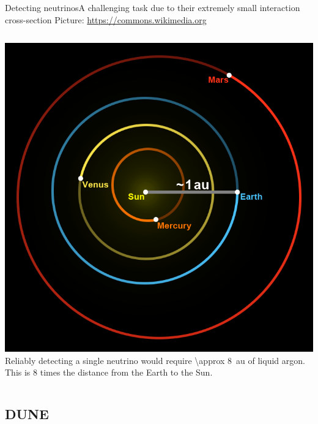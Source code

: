\documentclass[]{beamer}
\newcommand*{\emphcol}{red}
\newcommand*{\dune}{{DUNE}}
\begin{document}
\begin{frame}{Detecting neutrinos}{A challenging task due to their extremely small interaction cross-section}
	{\tiny Picture: \url{https://commons.wikimedia.org}}
	\begin{columns}[c]
		\centering
		\includegraphics[width=\textwidth]{defence/Astronomical_unit}\\
		Reliably detecting a single neutrino would require {\color{\emphcol}\SI{\approx 8}{au}} of liquid argon.
		This is \num{8} times the distance from the Earth to the Sun.
	\end{columns}
\end{frame}

\subsection{\dune}
\end{document}
